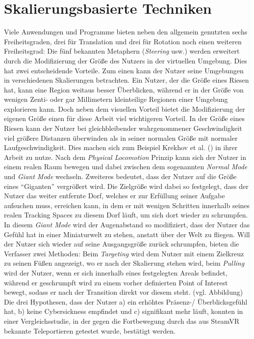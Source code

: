 \section{Skalierungsbasierte Techniken}
Viele Anwendungen und Programme bieten neben den allgemein genutzten sechs Freiheitsgraden, drei für Translation und drei für Rotation noch einen weiteren Freiheitsgrad:
Die fünf bekannten Metaphern (\textit{Steering} usw.) werden erweitert durch die Modifizierung der Größe des Nutzers in der virtuellen Umgebung. Dies hat zwei entscheidende Vorteile. Zum einen kann der Nutzer seine Umgebungen in verschiedenen Skalierungen betrachten. Ein Nutzer, der die Größe eines Riesen hat, kann eine Region weitaus besser Überblicken, während er in der Größe von wenigen Zenti- oder gar Millimetern kleinteilige Regionen einer Umgebung explorieren kann. Doch neben dem visuellen Vorteil bietet die Modifizierung der eigenen Größe einen für diese Arbeit viel wichtigeren Vorteil. In der Größe eines Riesen kann der Nutzer bei gleichbleibender wahrgenommener Geschwindigkeit viel größere Distanzen überwinden als in seiner normalen Größe mit normaler Laufgeschwindigkeit.
Dies machen sich zum Beispiel Krekhov et al. (\cite{Krekhov2018GulliVR}) in ihrer Arbeit zu nutze. Nach dem \textit{Physical Locomotion} Prinzip kann sich der Nutzer in einem realen Raum bewegen und dabei zwischen dem sogenannten \textit{Normal Mode} und \textit{Giant Mode} wechseln. Zweiteres bedeutet, dass der Nutzer auf die Größe eines “Giganten” vergrößert wird. Die Zielgröße wird dabei so festgelegt, dass der Nutzer das weiter entfernte Dorf, welches er zur Erfüllung seiner Aufgabe aufsuchen muss, erreichen kann, in dem er mit wenigen Schritten innerhalb seines realen Tracking Spaces zu diesem Dorf läuft, um sich dort wieder zu schrumpfen. In diesem \textit{Giant Mode} wird der Augenabstand so modifiziert, dass der Nutzer das Gefühl hat in einer Miniaturwelt zu stehen, anstatt über der Welt zu fliegen. Will der Nutzer sich wieder auf seine Ausgangsgröße zurück schrumpfen, bieten die Verfasser zwei Methoden: Beim \textit{Targeting} wird dem Nutzer mit einem Zielkreuz zu seinen Füßen angezeigt, wo er nach der Skalierung stehen wird, beim \textit{Pulling} wird der Nutzer, wenn er sich innerhalb eines festgelegten Areals befindet, während er geschrumpft wird zu einem vorher definierten Point of Interest bewegt, sodass er nach der Transition direkt vor diesem steht. (vgl. Abbildung)
Die drei Hypothesen, dass der Nutzer a) ein erhöhtes Präsenz-/ Überblicksgefühl hat, b) keine Cybersickness empfindet und c) signifikant mehr läuft, konnten in einer Vergleichsstudie, in der gegen die Fortbewegung durch das aus SteamVR bekannte Teleportieren getestet wurde, bestätigt werden.

